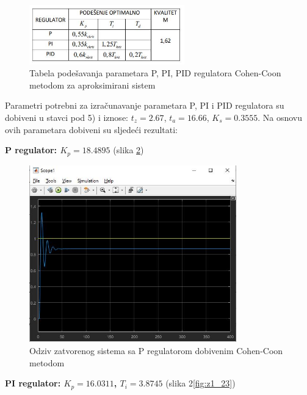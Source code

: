 \begin{figure} [H]
  \centering
  \includegraphics[width=0.6\textwidth]{z1_12}
  \caption{Tabela podešavanja parametara P, PI, PID regulatora Cohen-Coon metodom za aproksimirani sistem}
  \label{fig:z1_12}
\end{figure}
 
Parametri potrebni za izračunavanje parametara P, PI i PID regulatora su dobiveni u stavci pod 5) i iznose: $t_z=2.67$, $t_a=16.66$, $K_s=0.3555$. Na osnovu ovih parametara dobiveni su sljedeći rezultati:

\textbf{P regulator: $K_p=18.4895$} (slika \ref{fig:z1_22})
 
 \begin{figure} [H]
  \centering
  \includegraphics[width=0.8\textwidth]{z1_22}
  \caption{Odziv zatvorenog sistema sa P regulatorom dobivenim Cohen-Coon metodom}
  \label{fig:z1_22}
\end{figure} 

\textbf{PI regulator: $K_p=16.0311$, $T_i=3.8745$} (slika 2\ref{fig:z1_23})
 
